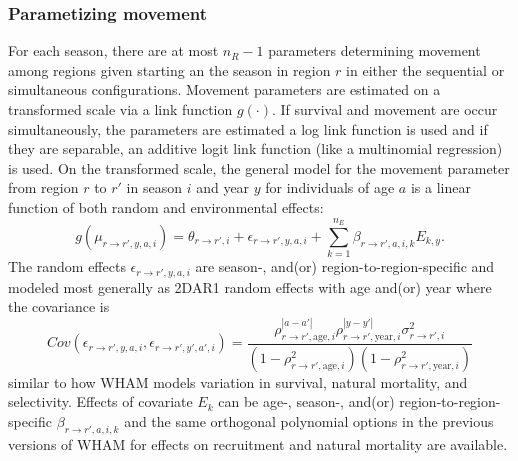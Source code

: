 \documentclass[
]{article}
\begin{document}
\hypertarget{parametizing-movement}{%
\subsubsection*{Parametizing movement}\label{parametizing-movement}}

For each season, there are at most \(n_R-1\) parameters determining
movement among regions given starting an the season in region \(r\) in
either the sequential or simultaneous configurations. Movement
parameters are estimated on a transformed scale via a link function
\(g(\cdot)\). If survival and movement are occur simultaneously, the
parameters are estimated a log link function is used and if they are
separable, an additive logit link function (like a multinomial
regression) is used. On the transformed scale, the general model for the
movement parameter from region \(r\) to \(r'\) in season \(i\) and year
\(y\) for individuals of age \(a\) is a linear function of both random
and environmental effects: \begin{equation*}
  g(\mu_{r\rightarrow r',y,a,i}) = \theta_{r\rightarrow r',i} + \epsilon_{r\rightarrow r',y,a,i} + \sum^{n_E}_{k=1} \beta_{r \rightarrow r',a,i,k} E_{k,y}.
\end{equation*} The random effects \(\epsilon_{r\rightarrow r',y,a,i}\)
are season-, and(or) region-to-region-specific and modeled most
generally as 2DAR1 random effects with age and(or) year where the
covariance is \begin{equation*}
  Cov\left(\epsilon_{r\rightarrow r',y,a,i},\epsilon_{r\rightarrow r',y',a',i}\right) =   \frac{\rho_{r\rightarrow r',\text{age},i}^{|a-a'|}\rho_{r\rightarrow r',\text{year},i}^{|y-y'|}\sigma^2_{r\rightarrow r',i}}{\left(1 -  \rho_{r\rightarrow r',\text{age},i}^2\right)\left(1 - \rho_{r\rightarrow r',\text{year},i}^2\right)}
\end{equation*} similar to how WHAM models variation in survival,
natural mortality, and selectivity. Effects of covariate \(E_k\) can be
age-, season-, and(or) region-to-region-specific
\(\beta_{r\rightarrow r',a,i,k}\) and the same orthogonal polynomial
options in the previous versions of WHAM for effects on recruitment and
natural mortality are available.
\end{document}
